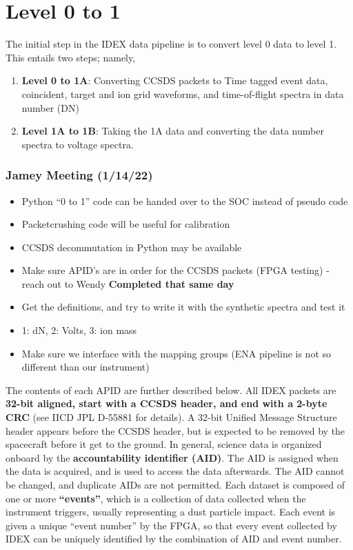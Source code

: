 \chapter{Level 0 to 1}

The initial step in the IDEX data pipeline is to convert level 0 data to level 1. This entails two steps; namely,

\begin{enumerate}
\item \textbf{Level 0 to 1A}: Converting CCSDS packets to Time tagged event data, coincident, target and ion grid waveforms, and time-of-flight spectra in data number (DN)
\item \textbf{Level 1A to 1B}: Taking the 1A data and converting the data number spectra to voltage spectra.
\end{enumerate}

\subsection{Jamey Meeting (1/14/22)}
\begin{itemize}
    \item Python “0 to 1” code can be handed over to the SOC instead of pseudo code
\item Packetcrushing code will be useful for calibration
\item CCSDS decommutation in Python may be available
\item Make sure APID’s are in order for the CCSDS packets (FPGA testing) - reach out to Wendy \textbf{Completed that same day}
\item Get the definitions, and try to write it with the synthetic spectra and test it
\item 1: dN, 2: Volts, 3: ion mass
\item Make sure we interface with the mapping groups (ENA pipeline is not so different than our instrument)
\end{itemize}


The contents of each APID are further described below.  All IDEX packets are \textbf{32-bit aligned, start with a CCSDS header, and end with a 2-byte CRC} (see IICD JPL D-55881 for details).  A 32-bit Unified Message Structure header appears before the CCSDS header, but is expected to be removed by the spacecraft before it get to the ground.
\newline
\newline
In general, science data is organized onboard by the \textbf{accountability identifier (AID)}.  The AID is assigned when the data is acquired, and is used to access the data afterwards.  The AID cannot be changed, and duplicate AIDs are not permitted.  Each dataset is composed of one or more \textbf{“events”}, which is a collection of data collected when the instrument triggers, usually representing a dust particle impact.  Each event is given a unique “event number” by the FPGA, so that every event collected by IDEX can be uniquely identified by the combination of AID and event number.  

